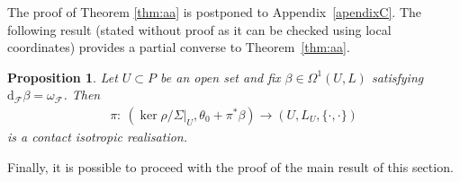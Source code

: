 \documentclass[pdftex]{sigma}
\numberwithin{equation}{section}
\newtheorem{Proposition}[Theorem]{Proposition}
\newcommand{\de}{\mathrm{d}} %
\begin{document}
The proof of Theorem \ref{thm:aa} is postponed to Appendix~\ref{apendixC}. The following result (stated without proof as it can be checked using local coordinates) provides a partial converse to Theorem~\ref{thm:aa}.

\begin{Proposition}\label{prop:local_cir}
Let $U \subset P$ be an open set and fix $\beta\in\Omega^1(U,L)$ satisfying $\de_{\mathcal{F}}\beta=\omega_{\mathcal{F}}$. Then
\begin{gather*}
 \pi\colon \ (\ker\rho/\Sigma|_U,\theta_0+\pi^*\beta)\to (U,L_U,\{\cdot,\cdot\})
\end{gather*}
is a contact isotropic realisation.
\end{Proposition}

Finally, it is possible to proceed with the proof of the main result of this section.
\end{document}
